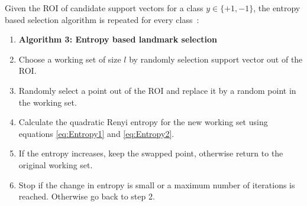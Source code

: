 \documentclass[preprint,12pt]{elsarticle}
\newtheorem*{remark}{Remark}
\begin{document}
	
	
	Given the ROI of candidate support vectors for a class $y \in \{+1,-1\}$, the entropy based selection algorithm is repeated for every class~\cite{suykens2002least}:
	\begin{enumerate}
		\item[]\textbf{Algorithm 3: Entropy based landmark selection}
		\item Choose a working set of size $l$ by randomly selection support vector out of the ROI.
		\item Randomly select a point out of the ROI and replace it by a random point in the working set.
		\item Calculate the quadratic Renyi entropy for the new working set using equations \eqref{eq:Entropy1} and \eqref{eq:Entropy2}.
		\item If the entropy increases, keep the swapped point, otherwise return to the original working set.
		\item Stop if the change in entropy is small or a maximum number of iterations is reached. Otherwise go back to step 2.
	\end{enumerate}
		
\end{document}
